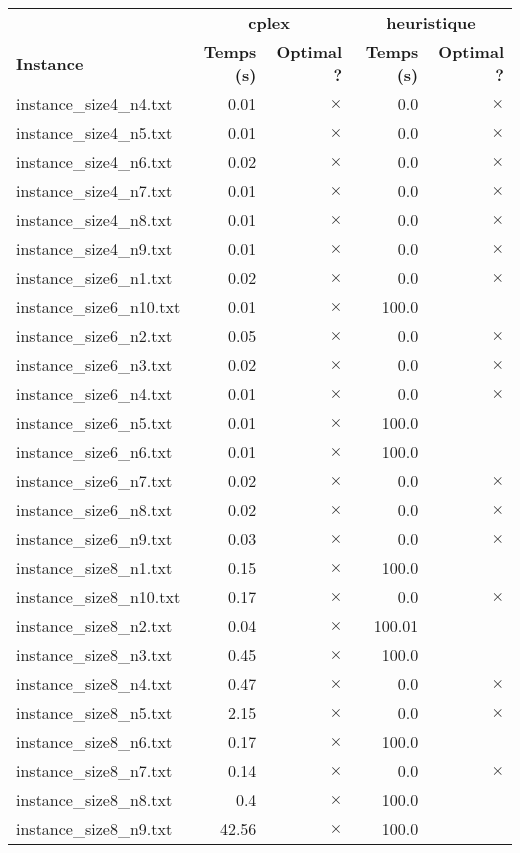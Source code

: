 \documentclass{article}
\begin{document}
\newpage
\begin{center}
\renewcommand{\arraystretch}{1.4}
 \begin{tabular}{lrrrr}
	\hline
 & \multicolumn{2}{c}{\textbf{cplex}} & \multicolumn{2}{c}{\textbf{heuristique}}\\
\textbf{Instance}  & \textbf{Temps (s)} & \textbf{Optimal ?}  & \textbf{Temps (s)} & \textbf{Optimal ?} \\\hline

instance\_size4\_n4.txt & 0.01 & 
$\times$
 & 0.0 & 
$\times$
\\
instance\_size4\_n5.txt & 0.01 & 
$\times$
 & 0.0 & 
$\times$
\\
instance\_size4\_n6.txt & 0.02 & 
$\times$
 & 0.0 & 
$\times$
\\
instance\_size4\_n7.txt & 0.01 & 
$\times$
 & 0.0 & 
$\times$
\\
instance\_size4\_n8.txt & 0.01 & 
$\times$
 & 0.0 & 
$\times$
\\
instance\_size4\_n9.txt & 0.01 & 
$\times$
 & 0.0 & 
$\times$
\\
instance\_size6\_n1.txt & 0.02 & 
$\times$
 & 0.0 & 
$\times$
\\
instance\_size6\_n10.txt & 0.01 & 
$\times$
 & 100.0 & 
\\
instance\_size6\_n2.txt & 0.05 & 
$\times$
 & 0.0 & 
$\times$
\\
instance\_size6\_n3.txt & 0.02 & 
$\times$
 & 0.0 & 
$\times$
\\
instance\_size6\_n4.txt & 0.01 & 
$\times$
 & 0.0 & 
$\times$
\\
instance\_size6\_n5.txt & 0.01 & 
$\times$
 & 100.0 & 
\\
instance\_size6\_n6.txt & 0.01 & 
$\times$
 & 100.0 & 
\\
instance\_size6\_n7.txt & 0.02 & 
$\times$
 & 0.0 & 
$\times$
\\
instance\_size6\_n8.txt & 0.02 & 
$\times$
 & 0.0 & 
$\times$
\\
instance\_size6\_n9.txt & 0.03 & 
$\times$
 & 0.0 & 
$\times$
\\
instance\_size8\_n1.txt & 0.15 & 
$\times$
 & 100.0 & 
\\
instance\_size8\_n10.txt & 0.17 & 
$\times$
 & 0.0 & 
$\times$
\\
instance\_size8\_n2.txt & 0.04 & 
$\times$
 & 100.01 & 
\\
instance\_size8\_n3.txt & 0.45 & 
$\times$
 & 100.0 & 
\\
instance\_size8\_n4.txt & 0.47 & 
$\times$
 & 0.0 & 
$\times$
\\
instance\_size8\_n5.txt & 2.15 & 
$\times$
 & 0.0 & 
$\times$
\\
instance\_size8\_n6.txt & 0.17 & 
$\times$
 & 100.0 & 
\\
instance\_size8\_n7.txt & 0.14 & 
$\times$
 & 0.0 & 
$\times$
\\
instance\_size8\_n8.txt & 0.4 & 
$\times$
 & 100.0 & 
\\
instance\_size8\_n9.txt & 42.56 & 
$\times$
 & 100.0 & 
\\
\hline\end{tabular}
\end{center}
\end{document}
